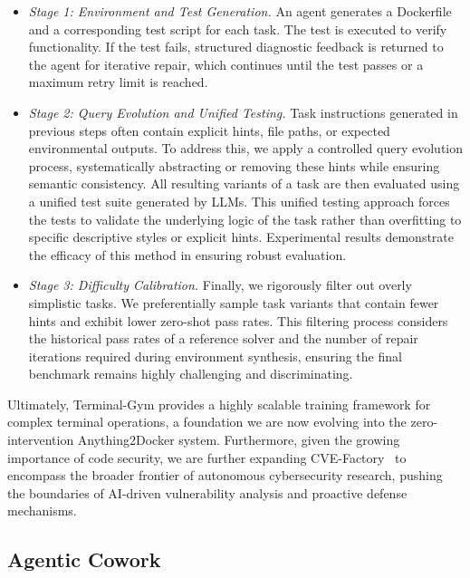 \begin{itemize}
    \item \textit{Stage 1: Environment and Test Generation.} An agent generates a Dockerfile and a corresponding test script for each task. The test is executed to verify functionality. If the test fails, structured diagnostic feedback is returned to the agent for iterative repair, which continues until the test passes or a maximum retry limit is reached.
    \item \textit{Stage 2: Query Evolution and Unified Testing.} Task instructions generated in previous steps often contain explicit hints, file paths, or expected environmental outputs. To address this, we apply a controlled query evolution process, systematically abstracting or removing these hints while ensuring semantic consistency. All resulting variants of a task are then evaluated using a unified test suite generated by LLMs. This unified testing approach forces the tests to validate the underlying logic of the task rather than overfitting to specific descriptive styles or explicit hints. Experimental results demonstrate the efficacy of this method in ensuring robust evaluation.
    \item \textit{Stage 3: Difficulty Calibration.} Finally, we rigorously filter out overly simplistic tasks. We preferentially sample task variants that contain fewer hints and exhibit lower zero-shot pass rates. This filtering process considers the historical pass rates of a reference solver and the number of repair iterations required during environment synthesis, ensuring the final benchmark remains highly challenging and discriminating.
\end{itemize}

Ultimately, Terminal-Gym provides a highly scalable training framework for complex terminal operations, a foundation we are now evolving into the zero-intervention Anything2Docker system. Furthermore, given the growing importance of code security, we are further expanding CVE-Factory~\cite{luo2026cvefactory} to encompass the broader frontier of autonomous cybersecurity research, pushing the boundaries of AI-driven vulnerability analysis and proactive defense mechanisms.

\subsection{Agentic Cowork}
\label{sec:agentic-cowork-data}

